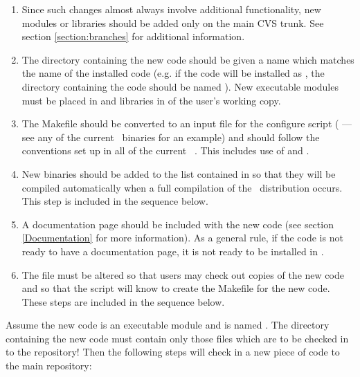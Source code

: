 \begin{enumerate}
\item Since such changes almost always involve additional functionality,
new modules or libraries should be added only on the main CVS trunk.
See section \ref{section:branches} for additional information.

\item The directory containing the new code should be given a name
which matches the name of the installed code (e.g. if the code
will be installed as , the directory containing
the code should be named ). New executable modules
must be placed in  and libraries in
 of the user's working copy.

\item The Makefile should be converted to an input file for the configure
script ( --- see any of the current \PSIthree\ binaries
for an example) and should follow the conventions set up in all of the
current \PSIthree\ . This includes use of 
and .

\item New binaries should be added to the list contained in
 so that they will be compiled
automatically when a full compilation of the \PSIthree\ distribution
occurs. This step is included in the sequence below.

\item A documentation page should be included with the new code (see
section \ref{Documentation} for more information). As a general rule,
if the code is not ready to have a documentation page, it is not ready
to be installed in \PSIthree. 

\item The  file must be altered so that users may check
out copies of the new code and so that the  script will
know to create the Makefile for the new code. These steps are included in
the sequence below.

\end{enumerate}

Assume the new code is an executable module and is named
. The directory containing the new code must contain
only those files which are to be checked in to the repository! Then the
following steps will check in a new piece of code to the main repository:

